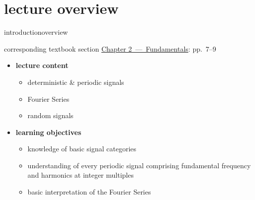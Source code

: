 




\subtitle{Module 2.0: Fundamentals~---~Signals}


	

    \section[overview]{lecture overview}
        \begin{frame}{introduction}{overview}
            \begin{block}{corresponding textbook section}
                    \href{http://ieeexplore.ieee.org/xpl/articleDetails.jsp?tp=&arnumber=6331119&}{Chapter 2~---~Fundamentals}: pp.~7--9
            \end{block}

            \begin{itemize}
                \item   \textbf{lecture content}
                    \begin{itemize}
                        \item   deterministic \& periodic signals
                        \item   Fourier Series
                        \item   random signals
                    \end{itemize}
                \bigskip
                \item<2->   \textbf{learning objectives}
                    \begin{itemize}
                        \item   knowledge of basic signal categories
                        \item   understanding of every periodic signal comprising fundamental frequency and harmonics at integer multiples
                        \item   basic interpretation of the Fourier Series
                    \end{itemize}
            \end{itemize}
        \end{frame}
        
